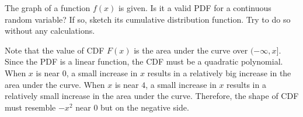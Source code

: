 \documentclass[../main.tex]{subfiles}
\begin{document}
\begin{exercise}
  The graph of a function \(f(x)\) is given. Is it a valid PDF for a continuous random variable? If so, sketch its cumulative distribution function. Try to do so without any calculations.


  \begin{solution}
    Note that the value of CDF \(F(x)\) is the area under the curve over \((-\infty, x]\).  Since the PDF is a linear function, the CDF must be a quadratic polynomial. When \(x\) is near \(0\), a small increase in \(x\) results in a relatively big increase in the area under the curve. When \(x\) is near \(4\), a small increase in \(x\) results in a relatively small increase in the area under the curve. Therefore, the shape of CDF must resemble \(-x^{2}\) near \(0\) but on the negative side.
  \end{solution}
\end{exercise}
\end{document}
